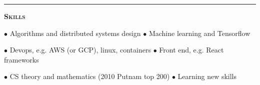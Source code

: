 \documentclass[11 pt]{article}
\begin{document}
\vspace{6pt}

\hrule

\begin{center}\begin{Large}\textsc{\textbf{Skills}\\}\end{Large}\end{center}


$\bullet$ Algorithms and distributed systems design \hfill
$\bullet$ Machine learning and Tensorflow

$\bullet$ Devops, e.g. AWS (or GCP), linux, containers \hfill
$\bullet$ Front end, e.g. React frameworks

$\bullet$ CS theory and mathematics (2010 Putnam top 200) \hfill
$\bullet$ Learning new skills



\begin{comment}

\vspace{12 pt}
\hrule

\begin{center}\begin{Large}\textsc{\textbf{Awards and Honors}\\}\end{Large}\end{center}

\begin{small}
\noindent
\textbf{William Lowell Putnam Mathematical Competition Top 200} \hfill 2010\\
\textbf{USA Mathematics Olympiad qualifier} \hfill 2006, 2007, 2008

\end{small}
\vspace{8 pt}
\end{comment}
\end{document}
